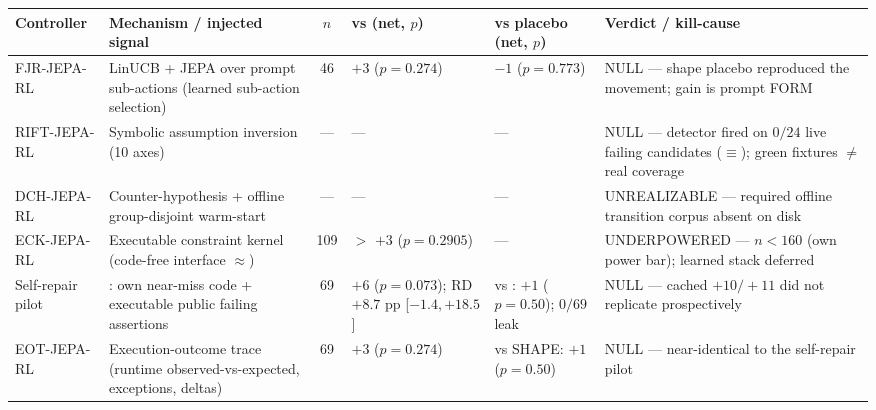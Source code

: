 \footnotesize
\setlength{\tabcolsep}{4pt}
\renewcommand{\arraystretch}{1.25}
\begin{tabular}{p{1.6cm} p{2.7cm} c p{2.4cm} p{2.5cm} p{3.0cm}}
\toprule
Controller & Mechanism / injected signal & $n$ & vs \armB{} (net, $p$) & vs placebo (net, $p$) & Verdict / kill-cause \\
\midrule
FJR-JEPA-RL &
LinUCB + JEPA over prompt sub-actions (learned sub-action selection) &
46 &
$+3$ ($p{=}0.274$) &
$-1$ ($p{=}0.773$) &
NULL --- shape placebo reproduced the movement; gain is prompt FORM \\
\addlinespace
RIFT-JEPA-RL &
Symbolic assumption inversion (10 axes) &
--- &
--- &
--- &
NULL --- detector fired on $0/24$ live failing candidates ($\equiv$\armB{}); green fixtures $\neq$ real coverage \\
\addlinespace
DCH-JEPA-RL &
Counter-hypothesis + offline group-disjoint warm-start &
--- &
--- &
--- &
UNREALIZABLE --- required offline transition corpus absent on disk \\
\addlinespace
ECK-JEPA-RL &
Executable constraint kernel (code-free interface $\approx$\armTC{}) &
109 &
\armTC{}$>$\armB{} $+3$ ($p{=}0.2905$) &
--- &
UNDERPOWERED --- $n{<}160$ (own power bar); learned stack deferred \\
\addlinespace
Self-repair pilot &
\armCF{}: own near-miss code + executable public failing assertions &
69 &
$+6$ ($p{=}0.073$); RD $+8.7$ pp [$-1.4,+18.5$] &
vs \armGR{}: $+1$ ($p{=}0.50$); $0/69$ leak &
NULL --- cached $+10/+11$ did not replicate prospectively \\
\addlinespace
EOT-JEPA-RL &
Execution-outcome trace (runtime observed-vs-expected, exceptions, deltas) &
69 &
$+3$ ($p{=}0.274$) &
vs SHAPE: $+1$ ($p{=}0.50$) &
NULL --- near-identical to the self-repair pilot \\
\bottomrule
\end{tabular}
